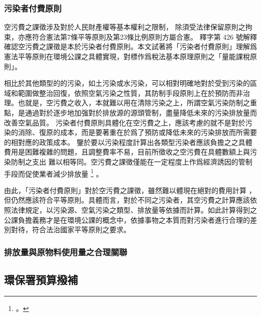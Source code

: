 \documentclass[12pt,a4paper]{article}
\begin{document}
\subsubsection{污染者付費原則}
空污費之課徵涉及對於人民財產權等基本權利之限制，
除須受法律保留原則之拘束，亦應符合憲法第7條平等原則及第23條比例原則方屬合憲。
釋字第 426 號解釋確認空污費之課徵是本於污染者付費原則。本文試著將「污染者付費原則」理解爲憲法平等原則在環境公課之具體實現，對標作爲稅法基本原理原則之「量能課稅原則」。

相比於其他類型的的污染，如土污染或水污染，可以相對明確地對於受到污染的區域和範圍做整治回復，依照空氣污染之性質，其防制手段原則上在於預防而非治理。也就是，空污費之收入，本就難以用在清除污染之上，所謂空氣污染防制之重點，是通過對於逐步地加强對於排放源的源頭管制，盡量降低未來的污染排放量而改善空氣品質。
污染者付費原則具體化在空污費之上，應該考慮的就不是對於污染的消除、復原的成本，而是要著重在於爲了預防或降低未來的污染排放而所需要的相對應的政策成本。
鑒於要以污染程度計算出各類型污染者應該負擔之之具體費用是困難複雜的問題，且調整費率不易，目前所徵收之空污費在具體數額上與污染防制之支出
難以相等同。空污費之課徵僅能在一定程度上作爲經濟誘因的管制手段而促使業者減少排放量
\footnote{。}
。

由此，「污染者付費原則」對於空污費之課徵，雖然難以體現在絕對的費用計算
，但仍然應該符合平等原則。具體而言，對於不同之污染者，其空污費之計算應該依照法律規定，以污染源、空氣污染之類型、排放量等依據而計算。如此計算得到之公課負擔義務才是在環境公課的概念中，依據事物之本質而對污染者進行合理的差別對待，符合法治國家平等原則之要求。


\subsubsection{排放量與原物料使用量之合理關聯}

\subsection{環保署預算撥補}
\end{document}
